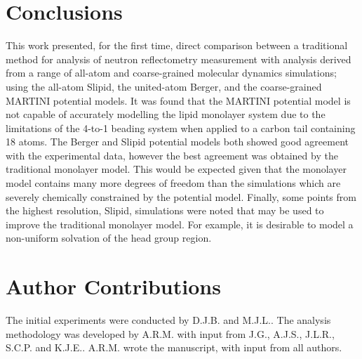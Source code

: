 \documentclass[amsmath,amssymb,twocolumn,superscriptaddress]{revtex4-1}
\begin{document}
\section{Conclusions}
This work presented, for the first time, direct comparison between a
traditional method for analysis of neutron reflectometry measurement with
analysis derived from a range of all-atom and coarse-grained molecular
dynamics simulations; using the all-atom Slipid, the united-atom Berger,
and the coarse-grained MARTINI potential models.
It was found that the MARTINI potential model is not capable of accurately
modelling the lipid monolayer system due to the limitations of the 4-to-1
beading system when applied to a carbon tail containing 18 atoms.
The Berger and Slipid potential models both showed good agreement with the
experimental data, however the best agreement was obtained by the
traditional monolayer model.
This would be expected given that the monolayer model contains many more
degrees of freedom than the simulations which are severely chemically
constrained by the potential model.
Finally, some points from the highest resolution, Slipid, simulations were
noted that may be used to improve the traditional monolayer model.
For example, it is desirable to model a non-uniform solvation of the head
group region.

\section{Author Contributions}
The initial experiments were conducted by D.J.B. and M.J.L..
The analysis methodology was developed by A.R.M. with input from J.G.,
A.J.S., J.L.R., S.C.P. and K.J.E..
A.R.M. wrote the manuscript, with input from all authors.



\end{document}
